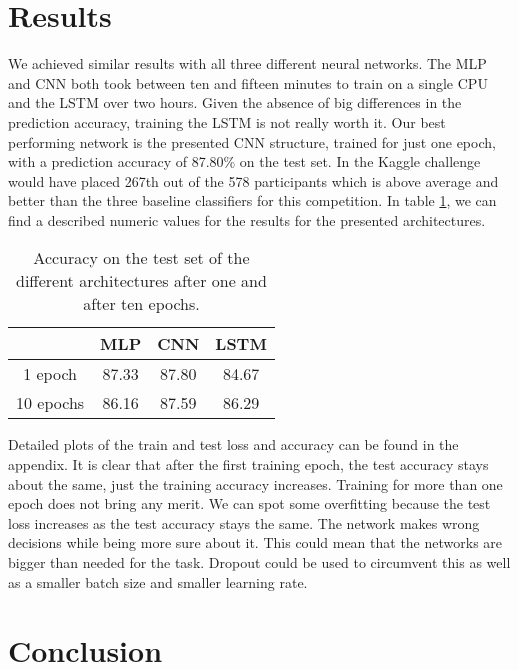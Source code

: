 \documentclass[conference]{IEEEtran}
\theoremstyle{plain}
\theoremstyle{definition}
\theoremstyle{remark}
\begin{document}
\section{Results}
\label{sec:results}
We achieved similar results with all three different neural networks. The MLP and CNN both took between ten and fifteen minutes to train on a single CPU and the LSTM over two hours. Given the absence of big differences in the prediction accuracy, training the LSTM is not really worth it. Our best performing network is the presented CNN structure, trained for just one epoch, with a prediction accuracy of 87.80\% on the test set. In the Kaggle challenge \cite{Kaggle} would have placed 267th out of the 578 participants which is above average and better than the three baseline classifiers \cite{kaggle_baselines} for this competition. In table \ref{tab:resu}, we can find a described numeric values for the results for the presented architectures. 

\begin{table}[tbh]
\begin{center}
	\begin{tabular}{ | c | c | c | c | } 
		\hline
		&\textbf{MLP} & \textbf{CNN} & \textbf{LSTM} \\ 
		\hline
		1 epoch & 87.33 & 87.80 & 84.67 \\
		\hline
		10 epochs & 86.16 & 87.59 & 86.29 \\
		\hline
	\end{tabular}
	\caption{Accuracy on the test set of the different architectures after one and after ten epochs.}
	\label{tab:resu}
\end{center}
\end{table}

Detailed plots of the train and test loss and accuracy can be found in the appendix. It is clear that after the first training epoch, the test accuracy stays about the same, just the training accuracy increases. Training for more than one epoch does not bring any merit. We can spot some overfitting because the test loss increases as the test accuracy stays the same. The network makes wrong decisions while being more sure about it. This could mean that the networks are bigger than needed for the task. Dropout could be used to circumvent this as well as a smaller batch size and smaller learning rate.
\section{Conclusion}
\label{sec:concl}
\end{document}
